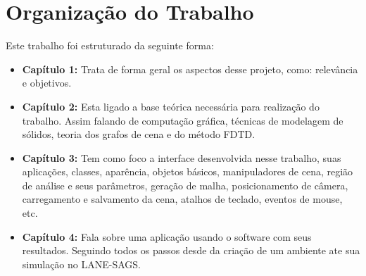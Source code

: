 \section{Organização do Trabalho}
Este trabalho foi estruturado da seguinte forma:
\begin{itemize}
\item \textbf{Capítulo 1:} Trata de forma geral os aspectos desse projeto, como: relevância e objetivos. 
\item \textbf{Capítulo 2:} Esta ligado a base teórica necessária para realização do trabalho. Assim falando de computação gráfica, técnicas de modelagem de sólidos, teoria dos grafos de cena e do método FDTD.
\item \textbf{Capítulo 3:} Tem como foco a interface desenvolvida nesse trabalho, suas aplicações, classes, aparência, objetos básicos, manipuladores de cena, região de análise e seus parâmetros, geração de malha, posicionamento de câmera, carregamento e salvamento da cena, atalhos de teclado, eventos de mouse, etc. 
\item \textbf{Capítulo 4:} Fala sobre uma aplicação usando o software com seus resultados. Seguindo todos os 
passos desde da criação de um ambiente ate sua simulação no LANE-SAGS.
\end{itemize}
